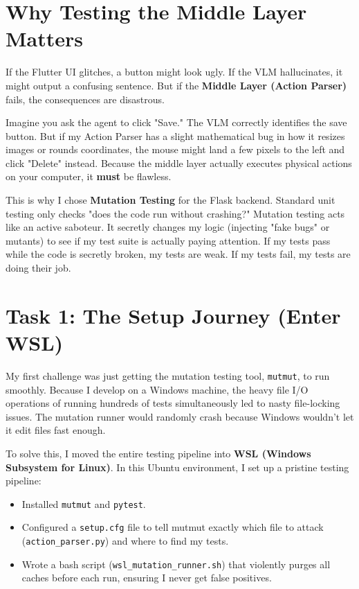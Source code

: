 \documentclass[a4paper,12pt]{article}
\begin{document}
\section{Why Testing the Middle Layer Matters}
If the Flutter UI glitches, a button might look ugly. If the VLM hallucinates, it might output a confusing sentence. But if the \textbf{Middle Layer (Action Parser)} fails, the consequences are disastrous. 

Imagine you ask the agent to click "Save." The VLM correctly identifies the save button. But if my Action Parser has a slight mathematical bug in how it resizes images or rounds coordinates, the mouse might land a few pixels to the left and click "Delete" instead. Because the middle layer actually executes physical actions on your computer, it \textbf{must} be flawless.

This is why I chose \textbf{Mutation Testing} for the Flask backend. Standard unit testing only checks "does the code run without crashing?" Mutation testing acts like an active saboteur. It secretly changes my logic (injecting "fake bugs" or mutants) to see if my test suite is actually paying attention. If my tests pass while the code is secretly broken, my tests are weak. If my tests fail, my tests are doing their job.

\section{Task 1: The Setup Journey (Enter WSL)}
My first challenge was just getting the mutation testing tool, \verb|mutmut|, to run smoothly. Because I develop on a Windows machine, the heavy file I/O operations of running hundreds of tests simultaneously led to nasty file-locking issues. The mutation runner would randomly crash because Windows wouldn't let it edit files fast enough.

To solve this, I moved the entire testing pipeline into \textbf{WSL (Windows Subsystem for Linux)}. In this Ubuntu environment, I set up a pristine testing pipeline:
\begin{itemize}
    \item Installed \verb|mutmut| and \verb|pytest|.
    \item Configured a \verb|setup.cfg| file to tell mutmut exactly which file to attack (\verb|action_parser.py|) and where to find my tests.
    \item Wrote a bash script (\verb|wsl_mutation_runner.sh|) that violently purges all caches before each run, ensuring I never get false positives.
\end{itemize}
\end{document}
